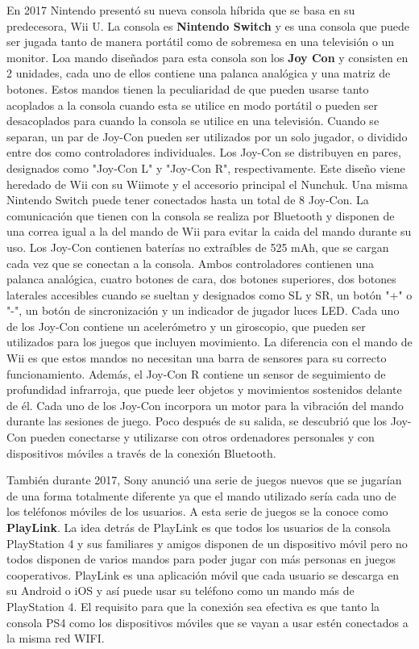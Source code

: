 En 2017 Nintendo present\'o su nueva consola h\'ibrida que se basa en su predecesora, Wii U. La consola es \textbf{Nintendo Switch} y es una consola que puede ser jugada tanto de manera port\'atil como de sobremesa en una televisi\'on o un monitor. Loa mando dise\~nados para esta consola son los \textbf{Joy Con} y consisten en 2 unidades, cada uno de ellos contiene una palanca anal\'ogica y una matriz de botones. Estos mandos tienen la peculiaridad de que pueden usarse tanto acoplados a la consola cuando esta se utilice en modo port\'atil o pueden ser desacoplados para cuando la consola se utilice en una televisi\'on. Cuando se separan, un par de Joy-Con pueden ser utilizados por un solo jugador, o dividido entre dos como controladores individuales. Los Joy-Con se distribuyen en pares, designados como "Joy-Con L" y "Joy-Con R", respectivamente. Este dise\~no viene heredado de Wii con su Wiimote y el accesorio principal el Nunchuk. Una misma Nintendo Switch puede tener conectados hasta un total de 8 Joy-Con. La comunicaci\'on que tienen con la consola se realiza por Bluetooth y disponen de una correa igual a la del mando de Wii para evitar la caida del mando durante su uso. Los Joy-Con contienen bater\'ias no extraíbles de 525 mAh, que se cargan cada vez que se conectan a la consola. Ambos controladores contienen una palanca anal\'ogica, cuatro botones de cara, dos botones superiores, dos botones laterales accesibles cuando se sueltan y designados como SL y SR, un bot\'on "+" o "-", un bot\'on de sincronizaci\'on y un indicador de jugador luces LED. Cada uno de los Joy-Con contiene un aceler\'ometro y un giroscopio, que pueden ser utilizados para los juegos que incluyen movimiento. La diferencia con el mando de Wii es que estos mandos no necesitan una barra de sensores para su correcto funcionamiento. Adem\'as, el Joy-Con R contiene un sensor de seguimiento de profundidad infrarroja, que puede leer objetos y movimientos sostenidos delante de \'el. Cada uno de los Joy-Con incorpora un motor para la vibraci\'on del mando durante las sesiones de juego. Poco despu\'es de su salida, se descubri\'o que los Joy-Con pueden conectarse y utilizarse con otros ordenadores personales y con dispositivos m\'oviles a trav\'es de la conexi\'on Bluetooth.

Tambi\'en durante 2017, Sony anunci\'o una serie de juegos nuevos que se jugar\'ian de una forma totalmente diferente ya que el mando utilizado ser\'ia cada uno de los tel\'efonos m\'oviles de los usuarios. A esta serie de juegos se la conoce como \textbf{PlayLink}. La idea detr\'as de PlayLink es que todos los usuarios de la consola PlayStation 4 y sus familiares y amigos disponen de un dispositivo m\'ovil pero no todos disponen de varios mandos para poder jugar con m\'as personas en juegos cooperativos. PlayLink es una aplicaci\'on m\'ovil que cada usuario se descarga en su Android o iOS y as\'i puede usar su tel\'efono como un mando m\'as de PlayStation 4. El requisito para que la conexi\'on sea efectiva es que tanto la consola PS4 como los dispositivos m\'oviles que se vayan a usar est\'en conectados a la misma red WIFI.

